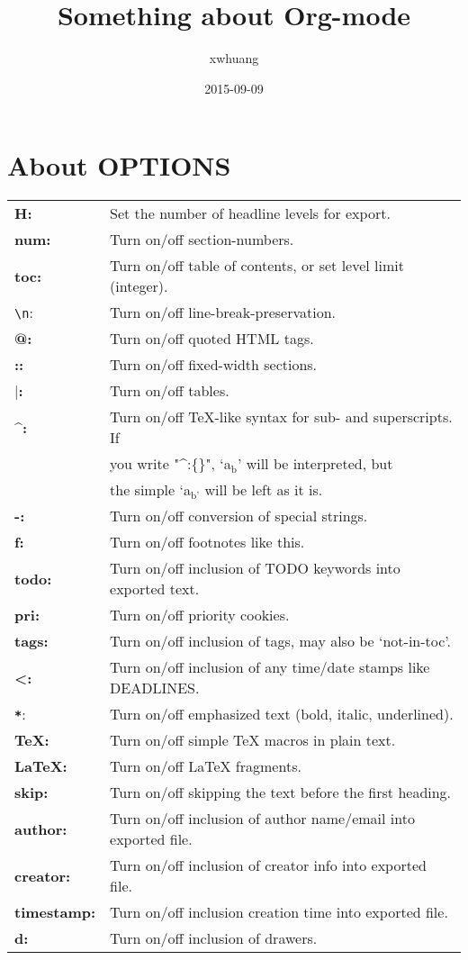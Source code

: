 \documentclass[11pt]{article}
\author{xwhuang}
\date{2015-09-09}
\title{Something about Org-mode}
\begin{document}
\maketitle

\section{About OPTIONS \label{About-OPTIONS}}
\label{sec-1}

\begin{center}
\begin{tabular}{ll}
\textbf{H:} & Set the number of headline levels for export.\\
\textbf{num:} & Turn on/off section-numbers.\\
\textbf{toc:} & Turn on/off table of contents, or set level limit (integer).\\
\verb~\n~: & Turn on/off line-break-preservation.\\
\textbf{@:} & Turn on/off quoted HTML tags.\\
\textbf{::} & Turn on/off fixed-width sections.\\
\textbf{$\vert{}$:} & Turn on/off tables.\\
\textbf{\^{}:} & Turn on/off \TeX{}-like syntax for sub- and superscripts.  If\\
 & you write "\^{}:\{\}", `a$_{\text{b}}$' will be interpreted, but\\
 & the simple `a$_{\text{b'}}$ will be left as it is.\\
\textbf{-:} & Turn on/off conversion of special strings.\\
\textbf{f:} & Turn on/off footnotes like this.\\
\textbf{todo:} & Turn on/off inclusion of TODO keywords into exported text.\\
\textbf{pri:} & Turn on/off priority cookies.\\
\textbf{tags:} & Turn on/off inclusion of tags, may also be `not-in-toc'.\\
\textbf{<:} & Turn on/off inclusion of any time/date stamps like DEADLINES.\\
\textbf{\verb~*~}: & Turn on/off emphasized text (bold, italic, underlined).\\
\textbf{\TeX{}:} & Turn on/off simple \TeX{} macros in plain text.\\
\textbf{\LaTeX{}:} & Turn on/off \LaTeX{} fragments.\\
\textbf{skip:} & Turn on/off skipping the text before the first heading.\\
\textbf{author:} & Turn on/off inclusion of author name/email into exported file.\\
\textbf{creator:} & Turn on/off inclusion of creator info into exported file.\\
\textbf{timestamp:} & Turn on/off inclusion creation time into exported file.\\
\textbf{d:} & Turn on/off inclusion of drawers.\\
\end{tabular}
\end{center}
\end{document}
